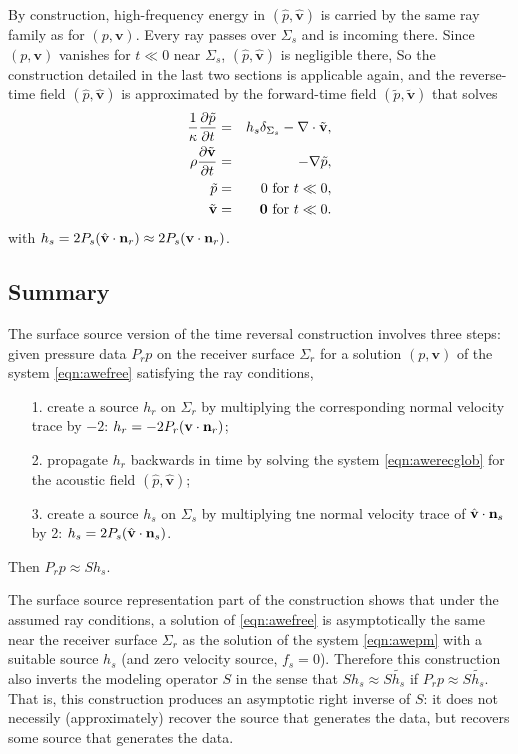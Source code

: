 \documentclass[12pt]{geophysics}
\newcommand{\bv}{\mathbf{v}}
\begin{document}
By construction, high-frequency energy in $(\hat{p},\hat{\bv})$ is
carried by the same ray family as for $(p,\bv)$. Every ray passes over
$\Sigma_s$ and is incoming there. Since $(p,\bv)$ vanishes for $t \ll
0$ near $\Sigma_s$, $(\hat{p},\hat{\bv})$ is negligible there,  So
the construction detailed in the last two sections is applicable
again, and the reverse-time field $(\hat{p},\hat{\bv})$ is
approximated by the forward-time field $(\tilde{p},\tilde{\bv})$ that solves
\begin{eqnarray}
\label{eqn:awesrcglob}
  \frac{1}{\kappa}\frac{\partial\tilde{p}}{\partial t} & = & h_s \delta_{\Sigma_s}
                                                      - \nabla \cdot \tilde{\bv}, \nonumber \\
  \rho\frac{\partial \tilde{\bv}}{\partial t} & = & - \nabla \tilde{p}, \nonumber \\
  \tilde{p} & = & 0 \mbox{ for } t\ll 0, \nonumber \\
  \tilde{\bv} & = & {\bf 0} \mbox{ for } t \ll 0.       
\end{eqnarray}
with $h_s = 2P_s(\hat{\bv} \cdot {\bf n}_r) \approx 2P_s(\bv \cdot
{\bf n}_r)$.

\subsection{Summary}
The surface source version of the time reversal construction involves three steps: given
pressure data $P_rp$ on the receiver surface $\Sigma_r$ for a solution
$(p,\bv)$ of the system \ref{eqn:awefree} satisfying the ray conditions,
\begin{itemize}
\item[1. ] create a source $h_r$ on $\Sigma_r$
  by multiplying the corresponding normal velocity trace by $-2$: $h_r = -2P_r(\bv
  \cdot {\bf n}_r)$;
\item[2. ] propagate $h_r$ backwards in time by solving the system
  \ref{eqn:awerecglob} for the acoustic field $(\hat{p},\hat{\bv})$;
\item[3. ] create a source $h_s$ on $\Sigma_s$ by  multiplying tne
  normal velocity trace of $\hat{\bv}\cdot {\bf n}_s$ by 2: $h_s = 2P_s(\hat{\bv}
  \cdot {\bf n}_s)$.
\end{itemize}
Then $P_r p \approx Sh_s$.

The surface source representation part of the construction shows that
under the assumed ray conditions, a solution of \ref{eqn:awefree} is
asymptotically the same near the receiver surface $\Sigma_r$ as the
solution of the system \ref{eqn:awepm} with a suitable source
$h_s$ (and zero velocity source, $f_s=0$). Therefore this
construction also inverts the modeling operator $S$ in the sense that
$Sh_s\approx S\tilde{h_s}$ if $P_rp \approx S\tilde{h_s}$. That is,
this construction produces an asymptotic right inverse of $S$: it
does not necessily (approximately) recover the source that generates
the data, but recovers some source that generates the data.
\end{document}
